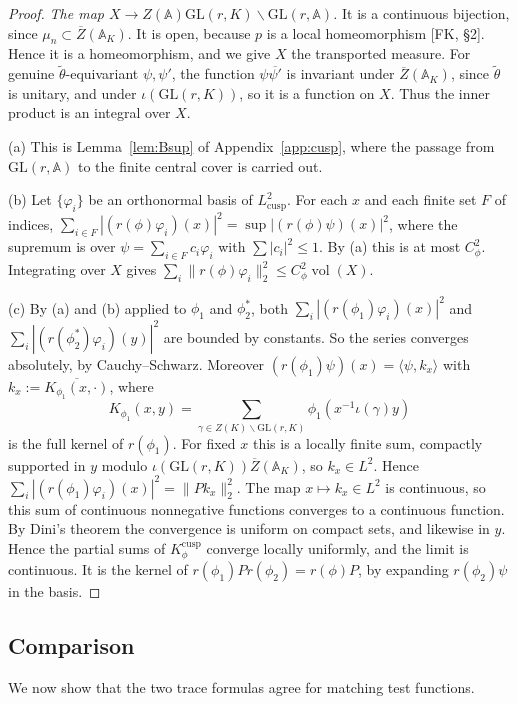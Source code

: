 \documentclass[12pt]{article}
\newcommand{\ov}[1]{\overline{#1}}
\newcommand{\A}{\mathbb{A}}
\newcommand{\vol}{\operatorname{vol}}
\newcommand{\GL}{\mathrm{GL}}
\newcommand{\Zb}{\ov{Z}}
\theoremstyle{plain}
\theoremstyle{definition}
\begin{document}
\begin{proof}
\emph{The map $X\to Z(\A)\GL(r,K)\backslash\GL(r,\A)$.} It is a continuous bijection, since $\mu_n\subset\Zb(\A_K)$. It is open, because $p$ is a local homeomorphism [FK, \S2]. Hence it is a homeomorphism, and we give $X$ the transported measure. For genuine $\tilde\theta$-equivariant $\psi,\psi'$, the function $\psi\ov{\psi'}$ is invariant under $\Zb(\A_K)$, since $\tilde\theta$ is unitary, and under $\iota(\GL(r,K))$, so it is a function on $X$. Thus the inner product is an integral over $X$.

(a) This is Lemma~\ref{lem:Bsup} of Appendix~\ref{app:cusp}, where the passage from $\GL(r,\A)$ to the finite central cover is carried out.

(b) Let $\{\varphi_i\}$ be an orthonormal basis of $L^2_{\mathrm{cusp}}$. For each $x$ and each finite set $F$ of indices, $\sum_{i\in F}|(r(\phi)\varphi_i)(x)|^2=\sup|(r(\phi)\psi)(x)|^2$, where the supremum is over $\psi=\sum_{i\in F}c_i\varphi_i$ with $\sum|c_i|^2\le1$. By (a) this is at most $C_\phi^2$. Integrating over $X$ gives $\sum_i\|r(\phi)\varphi_i\|_2^2\le C_\phi^2\vol(X)$.

(c) By (a) and (b) applied to $\phi_1$ and $\phi_2^*$, both $\sum_i|(r(\phi_1)\varphi_i)(x)|^2$ and $\sum_i|(r(\phi_2^*)\varphi_i)(y)|^2$ are bounded by constants. So the series converges absolutely, by Cauchy--Schwarz. Moreover $(r(\phi_1)\psi)(x)=\langle\psi,k_x\rangle$ with $k_x:=\ov{K_{\phi_1}(x,\cdot)}$, where \[ K_{\phi_1}(x,y)=\sum_{\gamma\in Z(K)\backslash\GL(r,K)}\phi_1(x^{-1}\iota(\gamma)y) \] is the full kernel of $r(\phi_1)$. For fixed $x$ this is a locally finite sum, compactly supported in $y$ modulo $\iota(\GL(r,K))\Zb(\A_K)$, so $k_x\in L^2$. Hence $\sum_i|(r(\phi_1)\varphi_i)(x)|^2=\|Pk_x\|_2^2$. The map $x\mapsto k_x\in L^2$ is continuous, so this sum of continuous nonnegative functions converges to a continuous function. By Dini's theorem the convergence is uniform on compact sets, and likewise in $y$. Hence the partial sums of $K^{\mathrm{cusp}}_\phi$ converge locally uniformly, and the limit is continuous. It is the kernel of $r(\phi_1)Pr(\phi_2)=r(\phi)P$, by expanding $r(\phi_2)\psi$ in the basis.
\end{proof}

\subsection{Comparison}\label{subsec:comparison}
We now show that the two trace formulas agree for matching test functions.
\end{document}

